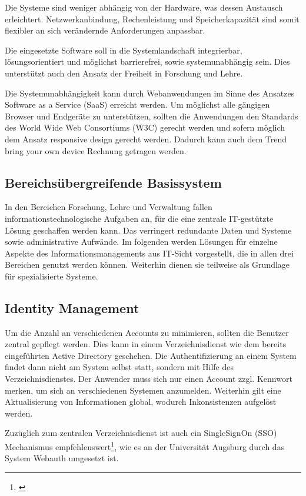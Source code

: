 Die Systeme sind weniger abhängig von der Hardware, was dessen Austausch erleichtert. Netzwerkanbindung, Rechenleistung und Speicherkapazität sind somit flexibler an sich verändernde Anforderungen anpassbar.

Die eingesetzte Software soll in die Systemlandschaft integrierbar, lösungsorientiert und möglichst barrierefrei, sowie systemunabhängig sein. Dies unterstützt auch den Ansatz der Freiheit in Forschung und Lehre.

Die Systemunabhängigkeit kann durch Webanwendungen im Sinne des Ansatzes Software as a Service (SaaS) erreicht werden. Um möglichst alle gängigen Browser und Endgeräte zu unterstützen, sollten die Anwendungen den Standards des World Wide Web Consortiums (W3C) gerecht werden und sofern möglich dem Ansatz responsive design gerecht werden. Dadurch kann auch dem Trend bring your own device Rechnung getragen werden.

\subsection{Bereichsübergreifende Basissystem}
In den Bereichen Forschung, Lehre und Verwaltung fallen informationstechnologische Aufgaben an, für die eine zentrale IT-gestützte Lösung geschaffen werden kann. Das verringert redundante Daten und Systeme sowie administrative Aufwände. Im folgenden werden Lösungen für einzelne Aspekte des Informationsmanagements aus IT-Sicht vorgestellt, die in allen drei Bereichen genutzt werden können. Weiterhin dienen sie teilweise als Grundlage für spezialisierte Systeme.

\subsection{Identity Management}
Um die Anzahl an verschiedenen Accounts zu minimieren, sollten die Benutzer zentral gepflegt werden. Dies kann in einem Verzeichnisdienst wie dem bereits eingeführten Active Directory geschehen. Die Authentifizierung an einem System findet dann nicht am System selbst statt, sondern mit Hilfe des Verzeichnisdienstes. Der Anwender muss sich nur einen Account zzgl. Kennwort merken, um sich an verschiedenen Systemen anzumelden. Weiterhin gilt eine Aktualisierung von Informationen global, wodurch Inkonsistenzen aufgelöst werden.

Zuzüglich zum zentralen Verzeichnisdienst ist auch ein SingleSignOn (SSO) Mechanismus empfehlenswert\footnote{\cite{zahn_itmanagement}}, wie es an der Universität Augsburg durch das System Webauth umgesetzt ist.

